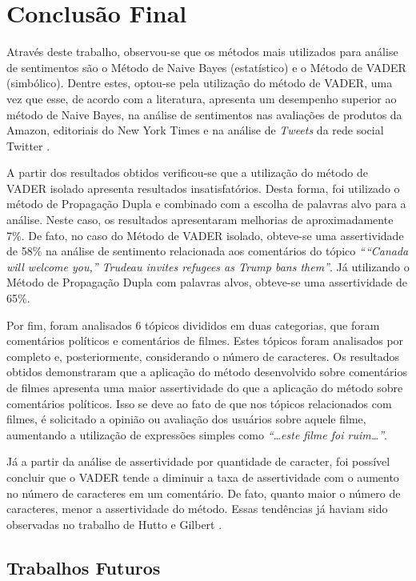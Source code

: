 \chapter{Conclusão Final}
\label{cap:conclusao}
Através deste trabalho, observou-se que os métodos mais utilizados para análise
de sentimentos são o Método de Naive Bayes (estatístico) e o Método de \ac{VADER} (simbólico). Dentre
estes, optou-se pela utilização do método de \ac{VADER}, uma vez que esse, de
acordo com a literatura, apresenta um desempenho superior ao método de Naive
Bayes, na análise de sentimentos nas avaliações de
produtos da Amazon, editoriais do New York Times e na análise
de \textit{Tweets} da rede social Twitter \cite{SentimentinSocialMedia}.

A partir dos resultados obtidos verificou-se que a utilização do método de
\ac{VADER} isolado apresenta resultados insatisfatórios. Desta forma, foi
utilizado o método de Propagação Dupla e combinado com a escolha de palavras
alvo para a análise. Neste caso, os resultados apresentaram melhorias de
aproximadamente 7\%. De fato, no caso do Método de \ac{VADER} isolado, obteve-se
uma assertividade de 58\% na análise de sentimento relacionada aos comentários
do tópico \textit{````Canada will welcome you,'' Trudeau invites refugees as
Trump bans them''}.
Já utilizando o Método de Propagação Dupla com palavras alvos, obteve-se uma assertividade de 65\%.

Por fim, foram analisados 6 tópicos divididos em duas categorias, que foram 
comentários políticos e comentários de filmes. Estes tópicos foram analisados
por completo e, posteriormente, considerando o número de caracteres. Os resultados obtidos demonstraram que a aplicação do método desenvolvido sobre
comentários de filmes apresenta uma maior assertividade do que a aplicação do
método sobre comentários políticos. Isso se deve ao fato de que nos tópicos
relacionados com filmes, é solicitado a opinião ou avaliação dos usuários sobre
aquele filme, aumentando a utilização de expressões simples como
\textit{``\ldots este filme foi ruim\ldots''}. 

Já a partir da análise de
assertividade por quantidade de caracter, foi possível concluir que o \ac{VADER}
tende a diminuir a taxa de assertividade com o aumento no número de caracteres
em um comentário. De fato, quanto maior o número de
caracteres, menor a assertividade do método. Essas tendências já haviam sido
observadas no trabalho de Hutto e Gilbert \cite{conf/icwsm/HuttoG14}.


\section{Trabalhos Futuros}

